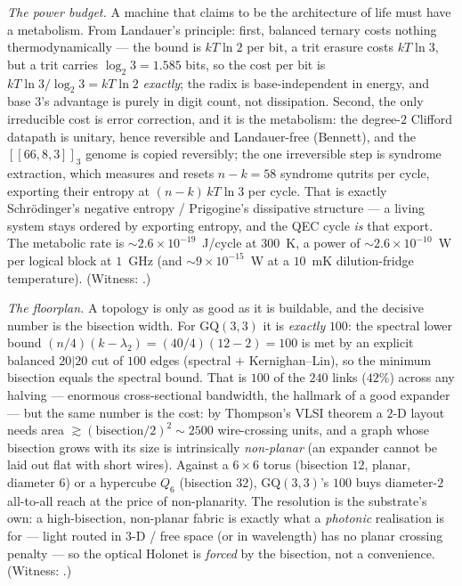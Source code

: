 \documentclass[11pt]{article}
\begin{document}
\emph{The power budget.} A machine that claims to be the architecture of life must have a metabolism.
From Landauer's principle: first, balanced ternary costs nothing thermodynamically --- the bound is
$kT\ln 2$ per bit, a trit erasure costs $kT\ln 3$, but a trit carries $\log_2 3=1.585$ bits, so the
cost per bit is $kT\ln 3/\log_2 3 = kT\ln 2$ \emph{exactly}; the radix is base-independent in energy,
and base $3$'s advantage is purely in digit count, not dissipation. Second, the only irreducible cost
is error correction, and it is the metabolism: the degree-$2$ Clifford datapath is unitary, hence
reversible and Landauer-free (Bennett), and the $[\![66,8,3]\!]_3$ genome is copied reversibly; the
one irreversible step is syndrome extraction, which measures and resets $n-k=58$ syndrome qutrits per
cycle, exporting their entropy at $(n-k)\,kT\ln 3$ per cycle. That is exactly Schr\"odinger's negative
entropy / Prigogine's dissipative structure --- a living system stays ordered by exporting entropy,
and the QEC cycle \emph{is} that export. The metabolic rate is $\sim2.6\times10^{-19}$~J/cycle at
$300$~K, a power of $\sim2.6\times10^{-10}$~W per logical block at $1$~GHz (and $\sim9\times10^{-15}$~W
at a $10$~mK dilution-fridge temperature). (Witness: .)

\emph{The floorplan.} A topology is only as good as it is buildable, and the decisive number is the
bisection width. For $\mathrm{GQ}(3,3)$ it is \emph{exactly} $100$: the spectral lower bound
$(n/4)(k-\lambda_2)=(40/4)(12-2)=100$ is met by an explicit balanced $20|20$ cut of $100$ edges
(spectral $+$ Kernighan--Lin), so the minimum bisection equals the spectral bound. That is $100$ of
the $240$ links ($42\%$) across any halving --- enormous cross-sectional bandwidth, the hallmark of a
good expander --- but the same number is the cost: by Thompson's VLSI theorem a $2$-D layout needs
area $\gtrsim(\mathrm{bisection}/2)^2\sim2500$ wire-crossing units, and a graph whose bisection grows
with its size is intrinsically \emph{non-planar} (an expander cannot be laid out flat with short
wires). Against a $6{\times}6$ torus (bisection $12$, planar, diameter $6$) or a hypercube $Q_6$
(bisection $32$), $\mathrm{GQ}(3,3)$'s $100$ buys diameter-$2$ all-to-all reach at the price of
non-planarity. The resolution is the substrate's own: a high-bisection, non-planar fabric is exactly
what a \emph{photonic} realisation is for --- light routed in $3$-D / free space (or in wavelength)
has no planar crossing penalty --- so the optical Holonet is \emph{forced} by the bisection, not a
convenience. (Witness: .)
\end{document}
